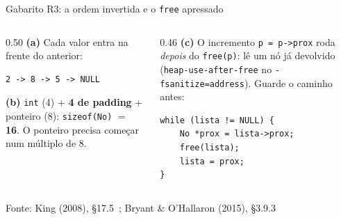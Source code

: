 \documentclass[aspectratio=169]{beamer}
\newcommand{\fonte}[1]{\vfill\hfill{\scriptsize\textcolor{UFSGray}{Fonte: #1}}}
\begin{document}
\begin{frame}[fragile]{Gabarito R3: a ordem invertida e o \texttt{free} apressado}
  \begin{columns}[T]
    \begin{column}{0.50\textwidth}
      \small
      \textbf{(a)} Cada valor entra na frente do anterior:
\begin{lstlisting}[style=shellStyle]
2 -> 8 -> 5 -> NULL
\end{lstlisting}
      \textbf{(b)} \texttt{int} (4) + \textbf{4 de padding} + ponteiro (8):
      \texttt{sizeof(No)} $=$ \textbf{16}. O ponteiro precisa começar num
      múltiplo de 8.
    \end{column}
    \begin{column}{0.46\textwidth}
      \small
      \textbf{(c)} O incremento \texttt{p = p->prox} roda \emph{depois} do
      \texttt{free(p)}: lê um nó já devolvido (\texttt{heap-use-after-free}
      no \texttt{-fsanitize=address}). Guarde o caminho antes:
\begin{lstlisting}[style=tinyC]
while (lista != NULL) {
    No *prox = lista->prox;
    free(lista);
    lista = prox;
}
\end{lstlisting}
    \end{column}
  \end{columns}
  \fonte{King (2008), §17.5~\cite{king2008c}; Bryant \& O'Hallaron (2015), §3.9.3~\cite{bryant2015computer}}
\end{frame}
\end{document}
